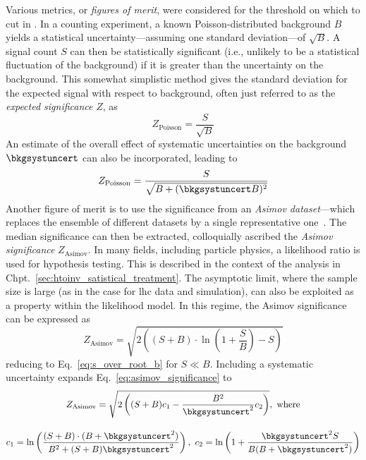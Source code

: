 Various metrics, or \emph{figures of merit}, were considered for the threshold on which to cut in \omegaTilde. In a counting experiment, a known Poisson-distributed background $B$ yields a statistical uncertainty---assuming one standard deviation---of $\sqrt{B}$. A signal count $S$ can then be statistically significant (i.e., unlikely to be a statistical fluctuation of the background) if it is greater than the uncertainty on the background. This somewhat simplistic method gives the standard deviation for the expected signal with respect to background, often just referred to as the \emph{expected significance} $Z$, as
\begin{equation}
Z_{\mathrm{Poisson}} = \frac{S}{\sqrt{B}}
\label{eq:s_over_root_b}
\end{equation}
An estimate of the overall effect of systematic uncertainties on the background $\bkgsystuncert$ can also be incorporated, leading to
\begin{equation}
Z_{\mathrm{Poisson}} = \frac{S}{\sqrt{B + (\bkgsystuncert B)^2}}
\label{eq:s_over_root_b_systs}
\end{equation}
Another figure of merit is to use the significance from an \emph{Asimov dataset}---which replaces the ensemble of different datasets by a single representative one~\cite{Cowan:2010js}. The median significance can then be extracted, colloquially ascribed the \emph{Asimov significance} $Z_{\mathrm{Asimov}}$. In many fields, including particle physics, a likelihood ratio is used for hypothesis testing. This is described in the context of the analysis in Chpt.~\ref{sec:htoinv_satistical_treatment}. The asymptotic limit, where the sample size is large (as in the case for \acrshort{lhc} data and simulation), can also be exploited as a property within the likelihood model. In this regime, the Asimov significance can be expressed as
\begin{equation}
Z_{\mathrm{Asimov}} = \sqrt{2 \left( (S + B) \cdot \ln\left(1 + \frac{S}{B} \right) - S \right)}
\label{eq:asimov_significance}
\end{equation}
reducing to Eq.~\ref{eq:s_over_root_b} for $S \ll B$. Including a systematic uncertainty expands Eq.~\ref{eq:asimov_significance} to
\begin{equation}
    \begin{gathered}  %
Z_{\mathrm{Asimov}} = \sqrt{2 \left( (S + B) c_1 - \frac{B^2}{\bkgsystuncert^2}c_2 \right)}, \ \text{where} \\[1em]
c_1 = \ln\left( \frac{(S + B) \cdot (B + \bkgsystuncert^2)}{B^2 + (S + B)\bkgsystuncert^2} \right), \ c_2 = \ln\left( 1 + \frac{\bkgsystuncert^2 S}{B(B + \bkgsystuncert^2)} \right)
    \end{gathered}
\label{eq:asimov_significance_systs}
\end{equation}
